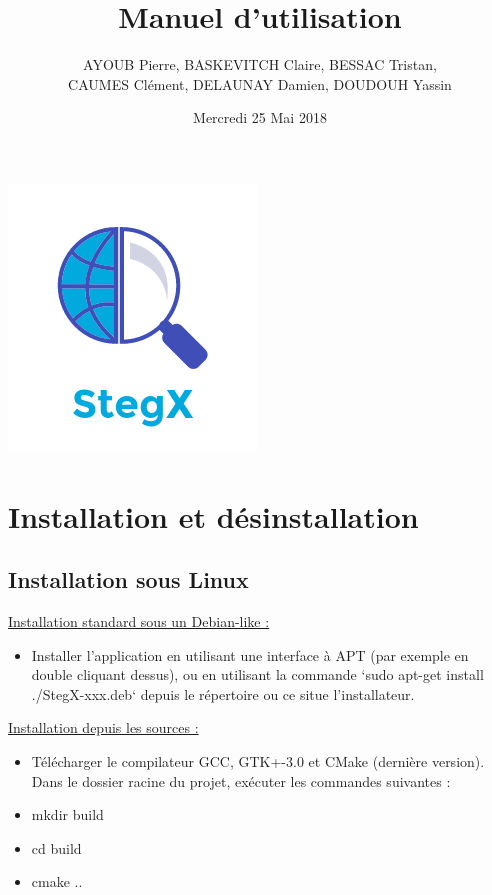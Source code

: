 \documentclass[11pt]{article}
\title{\huge{\textbf Manuel d'utilisation}}
\author{AYOUB Pierre, BASKEVITCH Claire, BESSAC Tristan, \\
CAUMES Clément, DELAUNAY Damien, DOUDOUH Yassin}
\date{Mercredi 25 Mai 2018}
\begin{document}
\maketitle
\vspace{20em}
\begin{center}\includegraphics{pictures/Application.png}\end{center}
\newpage

\tableofcontents

\newpage

\section{Installation et désinstallation}

\subsection{Installation sous Linux}

\underline{Installation standard sous un Debian-like :}

\begin{itemize}
\item Installer l'application en utilisant une interface à APT (par exemple en
    double cliquant dessus), ou en utilisant la commande `sudo apt-get install
    ./StegX-xxx.deb` depuis le répertoire ou ce situe l'installateur.
\end{itemize}

\underline{Installation depuis les sources :}

\begin{itemize}
\item Télécharger le compilateur GCC, GTK+-3.0 et CMake (dernière version). Dans
    le dossier racine du projet, exécuter les commandes suivantes :
\item mkdir build 
\item cd build
\item cmake ..
\end{itemize}
\end{document}
